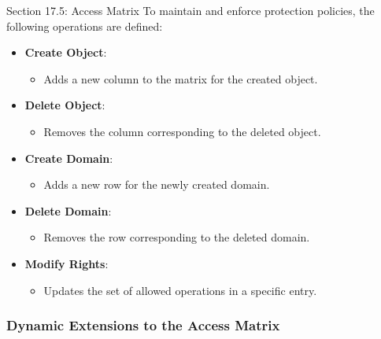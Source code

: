 \begin{notes}{Section 17.5: Access Matrix}
    To maintain and enforce protection policies, the following operations are defined:
    \begin{itemize}
        \item \textbf{Create Object}:
        \begin{itemize}
            \item Adds a new column to the matrix for the created object.
        \end{itemize}
        \item \textbf{Delete Object}:
        \begin{itemize}
            \item Removes the column corresponding to the deleted object.
        \end{itemize}
        \item \textbf{Create Domain}:
        \begin{itemize}
            \item Adds a new row for the newly created domain.
        \end{itemize}
        \item \textbf{Delete Domain}:
        \begin{itemize}
            \item Removes the row corresponding to the deleted domain.
        \end{itemize}
        \item \textbf{Modify Rights}:
        \begin{itemize}
            \item Updates the set of allowed operations in a specific entry.
        \end{itemize}
    \end{itemize}
    
    \subsubsection*{Dynamic Extensions to the Access Matrix}
    

\end{notes}

